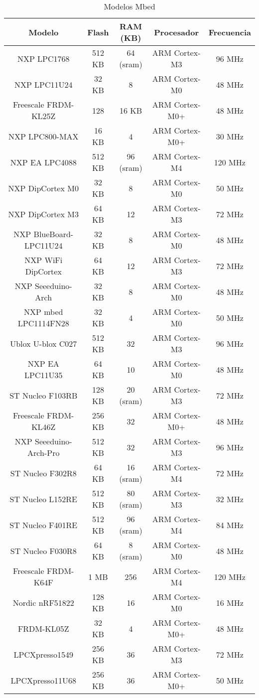 \begin{table}[htbp]
  \centering
  \scriptsize
  \caption{Modelos Mbed}
  \label{table-mbed}
  \begin{tabular}{|c|c|c|c|c|}
  \hline
    Modelo & Flash & RAM (KB) & Procesador & Frecuencia \\
  \hline
    NXP LPC1768 & 512 KB & 64 (sram) & ARM Cortex-M3 & 96 MHz \\
  \hline
    NXP LPC11U24 & 32 KB & 8 & ARM Cortex-M0 & 48 MHz \\
  \hline
    Freescale FRDM-KL25Z & 128 & 16 KB & ARM Cortex-M0+ & 48 MHz \\
  \hline
    NXP LPC800-MAX & 16 KB & 4 & ARM Cortex-M0+ & 30 MHz \\
  \hline
    NXP EA LPC4088 & 512 KB & 96 (sram) & ARM Cortex-M4 & 120 MHz \\
  \hline
    NXP DipCortex M0 & 32 KB & 8 & ARM Cortex-M0 & 50 MHz \\
  \hline
    NXP DipCortex M3 & 64 KB & 12 & ARM Cortex-M3 & 72 MHz \\
  \hline
    NXP BlueBoard-LPC11U24 & 32 KB & 8 & ARM Cortex-M0 & 48 MHz \\
  \hline
    NXP WiFi DipCortex & 64 KB & 12 & ARM Cortex-M3 & 72 MHz \\
  \hline
    NXP Seeeduino-Arch & 32 KB & 8 & ARM Cortex-M0 & 48 MHz \\
  \hline
    NXP mbed LPC1114FN28 & 32 KB & 4 & ARM Cortex-M0 & 50 MHz \\
  \hline
    Ublox U-blox C027 & 512 KB & 32 & ARM Cortex-M3 & 96 MHz \\
  \hline
    NXP EA LPC11U35 & 64 KB & 10 & ARM Cortex-M0 & 48 MHz \\
  \hline
    ST Nucleo F103RB & 128 KB & 20 (sram) & ARM Cortex-M3 & 72 MHz \\
  \hline
    Freescale FRDM-KL46Z & 256 KB & 32 & ARM Cortex-M0+ & 48 MHz \\
  \hline
    NXP Seeeduino-Arch-Pro & 512 KB & 32 & ARM Cortex-M3 & 96 MHz \\
  \hline
    ST Nucleo F302R8 & 64 KB & 16 (sram) & ARM Cortex-M4 & 72 MHz \\
  \hline
    ST Nucleo L152RE & 512 KB & 80 (sram) & ARM Cortex-M3 & 32 MHz \\
  \hline
    ST Nucleo F401RE & 512 KB & 96 (sram) & ARM Cortex-M4 & 84 MHz \\
  \hline
    ST Nucleo F030R8 & 64 KB & 8 (sram) & ARM Cortex-M0 & 48 MHz \\
  \hline
    Freescale FRDM-K64F & 1 MB & 256 & ARM Cortex-M4 & 120 MHz \\
  \hline
    Nordic nRF51822 & 128 KB & 16 & ARM Cortex-M0 & 16 MHz \\
  \hline
    FRDM-KL05Z & 32 KB & 4 & ARM Cortex-M0+ & 48 MHz \\
  \hline
    LPCXpresso1549 & 256 KB & 36 & ARM Cortex-M3 & 72 MHz \\
  \hline
    LPCXpresso11U68 & 256 KB & 36 & ARM Cortex-M0+ & 50 MHz \\
  \hline
  \end{tabular}
\end{table}


